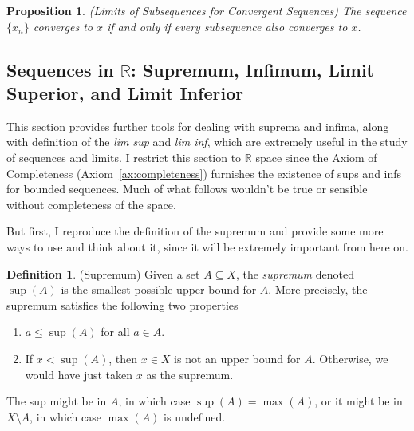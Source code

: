\documentclass[12pt]{article}
\numberwithin{equation}{section} %
\theoremstyle{plain}
\newtheorem{prop}[thm]{Proposition}
\theoremstyle{definition}
\newtheorem{defn}[thm]{Definition}
\theoremstyle{remark}
\newcommand{\R}{\mathbb{R}}
\begin{document}
\begin{prop}{\emph{(Limits of Subsequences for Convergent Sequences)}}
\label{prop:subseq}
The sequence $\{x_n\}$ converges to $x$ if and only if every subsequence
also converges to $x$.
\end{prop}


\subsection{Sequences in $\R$: Supremum, Infimum, Limit Superior, and
Limit Inferior}

This section provides further tools for dealing with suprema and infima,
along with definition of the \emph{lim sup} and \emph{lim inf}, which
are extremely useful in the study of sequences and limits.
I restrict this section to $\R$ space since the Axiom of Completeness
(Axiom~\ref{ax:completeness}) furnishes the existence of sups and infs
for bounded sequences. Much of what follows wouldn't be true or sensible
without completeness of the space.

But first, I reproduce the definition of the supremum and provide some
more ways to use and think about it, since it will be extremely
important from here on.

\begin{defn}{(Supremum)}
\label{defn:supdef2}
Given a set $A\subseteq X$, the \emph{supremum} denoted $\sup(A)$ is the
smallest possible upper bound for $A$.
More precisely, the supremum satisfies the following two properties
\begin{enumerate}
  \item $a\leq \sup(A)$ for all $a\in A$.
  \item If $x<\sup(A)$, then $x\in X$ is not an upper bound for $A$.
    Otherwise, we would have just taken $x$ as the supremum.
\end{enumerate}
The sup might be in $A$, in which case $\sup(A) = \max(A)$, or it might
be in $X\setminus A$, in which case $\max(A)$ is undefined.
\end{defn}
\end{document}
